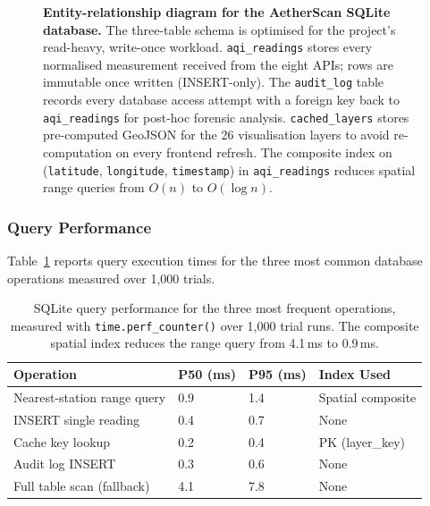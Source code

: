 \documentclass[12pt,a4paper]{article}
\begin{document}
\begin{figure}[H]
\caption[SQLite database entity-relationship diagram]{%
  \textbf{Entity-relationship diagram for the AetherScan SQLite database.}
  The three-table schema is optimised for the project's read-heavy, write-once
  workload. \texttt{aqi\_readings} stores every normalised measurement received
  from the eight APIs; rows are immutable once written (INSERT-only). The
  \texttt{audit\_log} table records every database access attempt with a foreign
  key back to \texttt{aqi\_readings} for post-hoc forensic analysis.
  \texttt{cached\_layers} stores pre-computed GeoJSON for the 26 visualisation
  layers to avoid re-computation on every frontend refresh. The composite index
  on (\texttt{latitude}, \texttt{longitude}, \texttt{timestamp}) in
  \texttt{aqi\_readings} reduces spatial range queries from $O(n)$ to $O(\log n)$.}
\label{fig:dbschema}
\end{figure}

\subsubsection{Query Performance}
Table~\ref{tab:dbperf} reports query execution times for the three most
common database operations measured over 1,000 trials.

\begin{table}[H]
\centering
\caption[Database query performance]{%
SQLite query performance for the three most frequent operations, measured
with \texttt{time.perf\_counter()} over 1,000 trial runs. The composite
spatial index reduces the range query from 4.1\,ms to 0.9\,ms.}
\label{tab:dbperf}
\begin{tabularx}{\textwidth}{@{}lXXX@{}}
\toprule
\textbf{Operation} & \textbf{P50 (ms)} & \textbf{P95 (ms)} & \textbf{Index Used} \\
\midrule
Nearest-station range query  & 0.9  & 1.4  & Spatial composite \\
INSERT single reading        & 0.4  & 0.7  & None              \\
Cache key lookup             & 0.2  & 0.4  & PK (layer\_key)   \\
Audit log INSERT             & 0.3  & 0.6  & None              \\
Full table scan (fallback)   & 4.1  & 7.8  & None              \\
\bottomrule
\end{tabularx}
\end{table}
\end{document}

